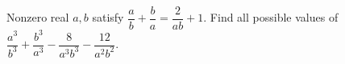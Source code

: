 Nonzero real $a,b$ satisfy $\dfrac{a}{b}+\dfrac{b}{a}=\dfrac{2}{ab}+1$. Find all possible values of $\dfrac{a^3}{b^3}+\dfrac{b^3}{a^3}-\dfrac{8}{a^3b^3}-\dfrac{12}{a^2b^2}$.
